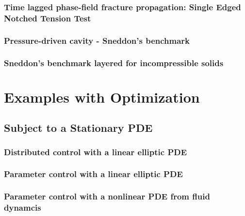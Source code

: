 \documentclass[a4paper,cleardoubleempty]{scrreprt}
\theoremstyle{plain}
\theoremstyle{remark}
\begin{document}
\subsection{Time lagged phase-field fracture propagation: Single Edged Notched Tension Test}
\label{PDE_SENT}

\clearpage
\subsection{Pressure-driven cavity - Sneddon's benchmark}
\label{PDE_Sneddon}

\clearpage
\subsection{Sneddon's benchmark layered for incompressible solids}
\label{PDE_Sneddon-incompressible}

\clearpage
\chapter{Examples with Optimization}
\label{OPT}
\section{Subject to a Stationary PDE}
\label{OPT_Stat}
\subsection{Distributed control with a linear elliptic PDE}
\label{OPT_Stat_Distrib_Lin_Ellipt}

\clearpage
\subsection{Parameter control with a linear elliptic PDE}
\label{OPT_Stat_Param_Lin_Ellipt}

\clearpage
\subsection{Parameter control with a nonlinear PDE from fluid dynamcis}
\label{OPT_Stat_Param_Nonlin_Fluid}

\clearpage
\end{document}
